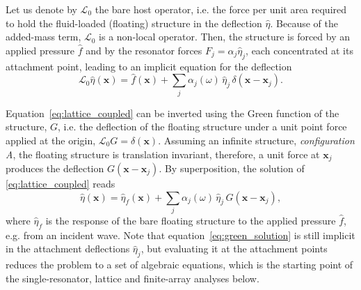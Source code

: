 Let us denote by $\mathcal{L}_0$ the bare host operator, i.e. the force per
unit area required to hold the fluid-loaded (floating) structure in the deflection $\widehat{\eta}$. Because of the added-mass term, $\mathcal{L}_0$ is a non-local operator. Then, the structure is forced by an applied pressure $\widehat{f}$ and by the resonator forces $F_j=\alpha_j\widehat{\eta}_j$, each concentrated at its attachment point, leading to an implicit equation for the deflection
\begin{equation}
  \label{eq:lattice_coupled}
  \mathcal{L}_0\widehat{\eta}(\mathbf{x})
  = \widehat{f}(\mathbf{x})
  + \sum_j \alpha_j(\omega)\,\widehat{\eta}_j\,
    \delta(\mathbf{x}-\mathbf{x}_j).
\end{equation}

Equation~\eqref{eq:lattice_coupled} can be inverted using the Green function of the structure, $G$, i.e. the deflection of the floating structure under a unit point force applied at the origin, $\mathcal{L}_0G=\delta(\mathbf{x})$. Assuming an infinite structure, \emph{configuration A}, the floating structure is translation invariant, therefore, a unit force at $\mathbf{x}_j$ produces the deflection $G(\mathbf{x}-\mathbf{x}_j)$. By superposition, the solution of \eqref{eq:lattice_coupled} reads
\begin{equation}
  \label{eq:green_solution}
  \widehat{\eta}(\mathbf{x})
  = \widehat{\eta}_f(\mathbf{x})
  + \sum_j \alpha_j(\omega)\,\widehat{\eta}_j\,G(\mathbf{x}-\mathbf{x}_j),
\end{equation}
where $\widehat{\eta}_f$ is the response of the bare floating structure to the applied pressure $\widehat{f}$, e.g. from an incident wave. Note that equation~\eqref{eq:green_solution} is still implicit in the attachment deflections $\widehat{\eta}_j$, but evaluating it at the attachment points reduces the problem to a set of algebraic equations, which is the starting point of the single-resonator, lattice and finite-array analyses below.

